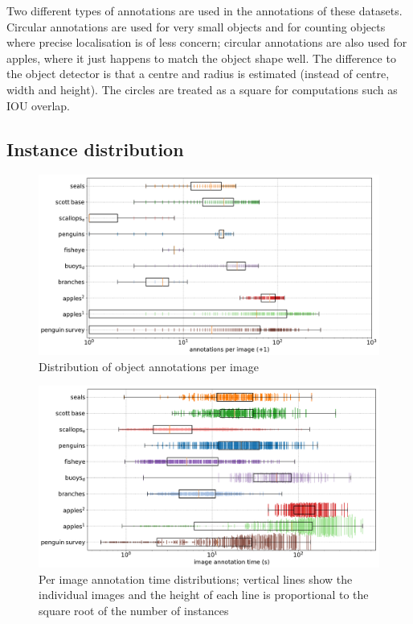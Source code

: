 Two different types of annotations are used in the annotations of these datasets. Circular annotations are used for very small objects and for counting objects where precise localisation is of less concern; circular annotations are also used for apples, where it just happens to match the object shape well. The difference to the object detector is that a centre and radius is estimated (instead of centre, width and height). The circles are treated as a square for computations such as \gls{IOU} overlap.

\subsection {Instance distribution}

\begin{figure}[ht!]
\centering
\includegraphics[width=1.0\linewidth]{charts/summaries/instances_boxplot.pdf}
\caption{ Distribution of object annotations per image }
\label{fig:instances_image_plot}
\end{figure}

\begin{figure}[ht]
\centering
\includegraphics[width=1.0\linewidth]{charts/summaries/duration_boxplot.pdf}
\caption{ Per image annotation time distributions; vertical lines show the individual images and the height of each line is proportional to the square root of the number of instances }
\label{fig:duration_boxplot}
\end{figure}

